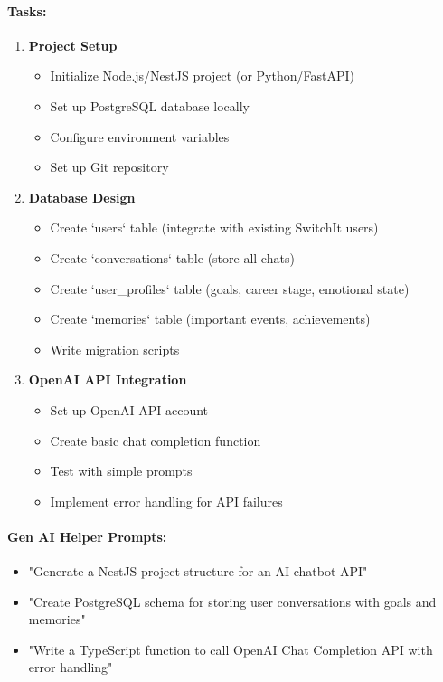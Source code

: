 \documentclass[12pt,a4paper]{article}
\begin{document}
\paragraph{Tasks:}
\begin{enumerate}[leftmargin=*]
    \item \textbf{Project Setup}
    \begin{itemize}
        \item Initialize Node.js/NestJS project (or Python/FastAPI)
        \item Set up PostgreSQL database locally
        \item Configure environment variables
        \item Set up Git repository
    \end{itemize}
    
    \item \textbf{Database Design}
    \begin{itemize}
        \item Create `users` table (integrate with existing SwitchIt users)
        \item Create `conversations` table (store all chats)
        \item Create `user\_profiles` table (goals, career stage, emotional state)
        \item Create `memories` table (important events, achievements)
        \item Write migration scripts
    \end{itemize}
    
    \item \textbf{OpenAI API Integration}
    \begin{itemize}
        \item Set up OpenAI API account
        \item Create basic chat completion function
        \item Test with simple prompts
        \item Implement error handling for API failures
    \end{itemize}
\end{enumerate}

\paragraph{Gen AI Helper Prompts:}
\begin{itemize}
    \item "Generate a NestJS project structure for an AI chatbot API"
    \item "Create PostgreSQL schema for storing user conversations with goals and memories"
    \item "Write a TypeScript function to call OpenAI Chat Completion API with error handling"
\end{itemize}
\end{document}
